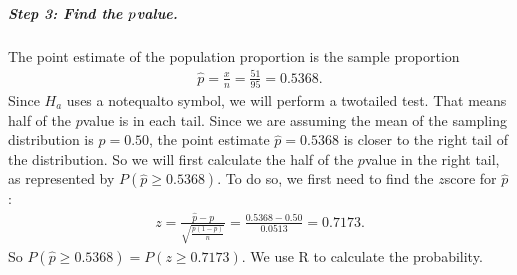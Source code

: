 \documentclass[letterpaper,10pt,english]{jupyterBook}
\begin{document}
\subparagraph{Step 3: Find the  \protect\(p\protect\)\sphinxhyphen{}value.}
\label{\detokenize{Ch6 An Introduction to Hypothesis Testing/6.4 Hypothesis Tests of One Population:id12}}
\sphinxAtStartPar
The point estimate of the population proportion is the sample proportion
\begin{equation*}
\begin{split} \hat{p} = \frac{x}{n} = \frac{51}{95} = 0.5368. \end{split}
\end{equation*}
\sphinxAtStartPar
Since \(H_a\) uses a not\sphinxhyphen{}equal\sphinxhyphen{}to symbol, we will perform a two\sphinxhyphen{}tailed test. That means half of the \(p\)\sphinxhyphen{}value is in each tail. Since we are assuming the mean of the sampling distribution is \(p = 0.50\), the point estimate \(\hat{p} = 0.5368\) is closer to the right tail of the distribution. So we will first calculate the half of the \(p\)\sphinxhyphen{}value in the right tail, as represented by \(P(\hat{p} \geq 0.5368)\). To do so, we first need to find the \(z\)\sphinxhyphen{}score for \(\hat{p}\):
\begin{equation*}
\begin{split} z = \frac{\hat{p} - p}{\sqrt{\frac{p(1-p)}{n}}} = \frac{0.5368 - 0.50}{0.0513} = 0.7173. \end{split}
\end{equation*}
\sphinxAtStartPar
So \(P(\hat{p} \geq 0.5368) = P(z \geq 0.7173)\). We use R to calculate the probability.
\end{document}
